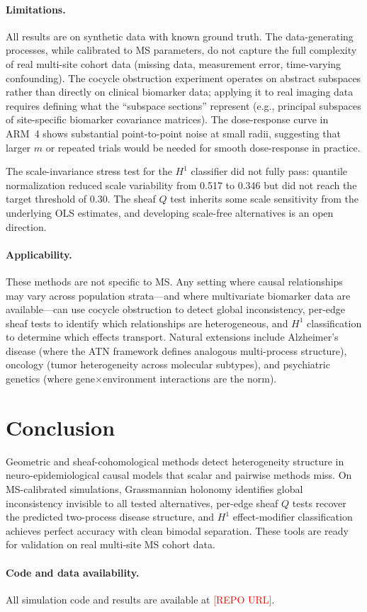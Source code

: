 \documentclass[11pt]{article}
\begin{document}
\paragraph{Limitations.}
All results are on synthetic data with known ground truth. The
data-generating processes, while calibrated to MS parameters, do not
capture the full complexity of real multi-site cohort data (missing
data, measurement error, time-varying confounding). The cocycle
obstruction experiment operates on abstract subspaces rather than
directly on clinical biomarker data; applying it to real imaging data
requires defining what the ``subspace sections'' represent
(e.g., principal subspaces of site-specific biomarker covariance
matrices). The dose-response curve in ARM~4 shows substantial
point-to-point noise at small radii, suggesting that larger $m$ or
repeated trials would be needed for smooth dose-response in practice.

The scale-invariance stress test for the $H^1$ classifier did not fully
pass: quantile normalization reduced scale variability from 0.517 to
0.346 but did not reach the target threshold of 0.30. The sheaf $Q$
test inherits some scale sensitivity from the underlying OLS estimates,
and developing scale-free alternatives is an open direction.

\paragraph{Applicability.}
These methods are not specific to MS. Any setting where causal
relationships may vary across population strata---and where multivariate
biomarker data are available---can use cocycle obstruction to detect
global inconsistency, per-edge sheaf tests to identify which
relationships are heterogeneous, and $H^1$ classification to determine
which effects transport. Natural extensions include Alzheimer's disease
(where the ATN framework defines analogous multi-process structure),
oncology (tumor heterogeneity across molecular subtypes), and
psychiatric genetics (where gene$\times$environment interactions are
the norm).

\section{Conclusion}

Geometric and sheaf-cohomological methods detect heterogeneity structure
in neuro-epidemiological causal models that scalar and pairwise methods
miss. On MS-calibrated simulations, Grassmannian holonomy identifies
global inconsistency invisible to all tested alternatives, per-edge
sheaf $Q$ tests recover the predicted two-process disease structure, and
$H^1$ effect-modifier classification achieves perfect accuracy with
clean bimodal separation. These tools are ready for validation on real
multi-site MS cohort data.

\paragraph{Code and data availability.}
All simulation code and results are available at
\textcolor{red}{[REPO URL]}.



\end{document}
